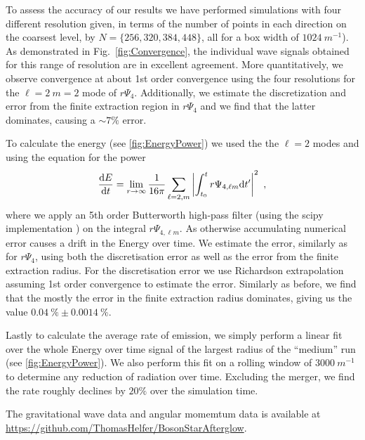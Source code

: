 \documentclass[11pt]{report}  %
\begin{document}
To assess the accuracy of our results we have performed simulations with four different resolution given, in terms of the number of points in each direction on the coarsest level, by $N = \{256,320,384,448\}$, all for a box width 
of $1024~m^{-1}$). As demonstrated in Fig.~\ref{fig:Convergence}, the individual wave signals obtained for this range of resolution are
in excellent agreement.
More quantitatively, we observe convergence at about 1st order convergence using the four resolutions for the $\ell = 2~m=2$ mode of $r\Psi_4$. Additionally, we estimate the discretization and error from the finite extraction region in $r\Psi_4$ and we find that the latter dominates, causing a $\sim 7\%$ error. 


To calculate the energy (see \cref{fig:EnergyPower}) we used the the $\ell = 2 $ modes and using the equation for the power
\begin{equation}\label{eq:GWpower}
    \frac{{\rm d}E}{{\rm d}t} = \lim_{r\rightarrow \infty} \frac{1}{16 \pi} \sum_{\ell = 2, m} \left|\int_{t_0}^{t}  r\Psi_{4,\ell m}{\rm d}t^\prime \right|^2~,
\end{equation}
where we apply an 5th order Butterworth high-pass filter (using the scipy implementation \cite{jones_scipy_2001}) on the integral $r\Psi_{4,\ell m}$. As otherwise accumulating numerical error causes a  drift in the Energy over time. 
We estimate the error, similarly as for $r\Psi_4$, using both the discretisation error as well as the error from the finite extraction radius. For the discretisation error we use Richardson extrapolation assuming 1st order convergence to estimate the error. Similarly as before, we find that the mostly the error in the finite extraction radius dominates, giving us the value $ 0.04~\% \pm 0.0014~\% $. 

Lastly to calculate the average rate of emission, we simply perform a linear fit over the whole Energy over time signal of the largest radius of the ``medium'' run (see \cref{fig:EnergyPower}). We also perform this fit on a rolling window of $3000~m^{-1}$ to determine any reduction of radiation over time. Excluding the merger, we find the rate roughly declines by $20 \%$ over the simulation time. 

 The gravitational wave data and angular momemtum data is available at \url{https://github.com/ThomasHelfer/BosonStarAfterglow}.
\end{document}
